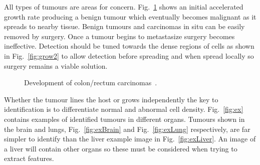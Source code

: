 \documentclass[journal]{IEEEtran}
\begin{document}
All types of tumours are areas for concern.
Fig.~\ref{fig:growing} shows an initial accelerated growth rate producing a benign tumour which eventually becomes malignant as it spreads to nearby tissue.
Benign tumours and carcinomas in situ can be easily removed by surgery.
Once a tumour begins to metastasize surgery becomes ineffective. 
Detection should be tuned towards the dense regions of cells as shown in Fig.~\ref{fig:grow2} to allow detection before spreading and when spread locally so surgery remains a viable solution.    

\begin{figure}[!htb]
	\centering
\caption{Development of colon/rectum carcinomas~\cite{cooper1992cancer}.}
\label{fig:growing}
\end{figure}





Whether the tumour lines the host or grows independently the key to identification is to differentiate normal and abnormal cell density. 
Fig.~\ref{fig:ex} contains examples of identified tumours in different organs.
Tumours shown in the brain and lungs, Fig.~\ref{fig:exBrain} and Fig.~\ref{fig:exLung} respectively, are far simpler to identify than the liver example image in Fig.~\ref{fig:exLiver}.
An image of a liver will contain other organs so these must be considered when trying to extract features.
\end{document}
